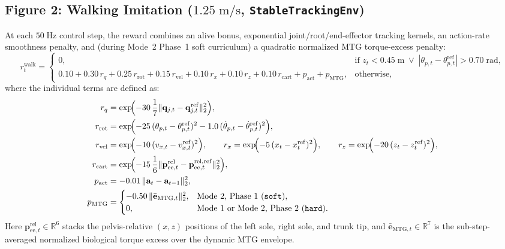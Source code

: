 \subsection*{Figure 2: Walking Imitation ($1.25\;\mathrm{m/s}$, \texttt{StableTrackingEnv})}

At each $50\;\mathrm{Hz}$ control step, the reward combines an alive bonus, exponential joint/root/end-effector tracking kernels, an action-rate smoothness penalty, and (during Mode~2 Phase~1 soft curriculum) a quadratic normalized MTG torque-excess penalty:
\begin{equation}
r_t^{\mathrm{walk}} =
\begin{cases}
0, & \text{if } z_t < 0.45\;\mathrm{m} \;\lor\; |\theta_{p,t} - \theta_{p,t}^{\mathrm{ref}}| > 0.70\;\mathrm{rad}, \\[6pt]
0.10 + 0.30\,r_q + 0.25\,r_{\mathrm{rot}} + 0.15\,r_{\mathrm{vel}} + 0.10\,r_x + 0.10\,r_z + 0.10\,r_{\mathrm{cart}} + p_{\mathrm{act}} + p_{\mathrm{MTG}}, & \text{otherwise},
\end{cases}
\end{equation}
where the individual terms are defined as:
\begin{align}
r_q &= \exp\!\Bigl(-30\,\frac{1}{7}\lVert \mathbf{q}_{j,t} - \mathbf{q}_{j,t}^{\mathrm{ref}} \rVert_2^2\Bigr), \\
r_{\mathrm{rot}} &= \exp\!\Bigl(-25\,(\theta_{p,t} - \theta_{p,t}^{\mathrm{ref}})^2 - 1.0\,(\dot{\theta}_{p,t} - \dot{\theta}_{p,t}^{\mathrm{ref}})^2\Bigr), \\
r_{\mathrm{vel}} &= \exp\!\Bigl(-10\,(v_{x,t} - v_{x,t}^{\mathrm{ref}})^2\Bigr), \qquad
r_x = \exp\!\Bigl(-5\,(x_t - x_t^{\mathrm{ref}})^2\Bigr), \qquad
r_z = \exp\!\Bigl(-20\,(z_t - z_t^{\mathrm{ref}})^2\Bigr), \\
r_{\mathrm{cart}} &= \exp\!\Bigl(-15\,\frac{1}{6}\lVert \mathbf{p}_{\mathrm{ee},t}^{\mathrm{rel}} - \mathbf{p}_{\mathrm{ee},t}^{\mathrm{rel,ref}} \rVert_2^2\Bigr), \\
p_{\mathrm{act}} &= -0.01\,\lVert \mathbf{a}_t - \mathbf{a}_{t-1} \rVert_2^2, \\
p_{\mathrm{MTG}} &=
\begin{cases}
-0.50\,\lVert \bar{\mathbf{e}}_{\mathrm{MTG},t} \rVert_2^2, & \text{Mode 2, Phase 1 (\texttt{soft})}, \\
0, & \text{Mode 1 or Mode 2, Phase 2 (\texttt{hard})}.
\end{cases}
\end{align}
Here $\mathbf{p}_{\mathrm{ee},t}^{\mathrm{rel}} \in \mathbb{R}^6$ stacks the pelvis-relative $(x, z)$ positions of the left sole, right sole, and trunk tip, and $\bar{\mathbf{e}}_{\mathrm{MTG},t} \in \mathbb{R}^7$ is the sub-step-averaged normalized biological torque excess over the dynamic MTG envelope.
